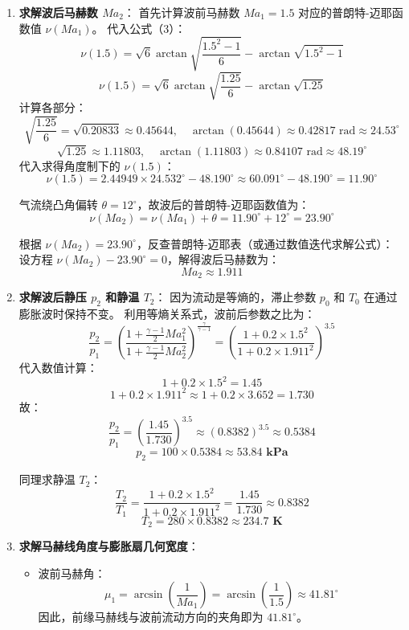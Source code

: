 \documentclass[11pt,a4paper]{ctexart}
\begin{document}
\begin{enumerate}
    \item \textbf{求解波后马赫数 $Ma_2$}：
    首先计算波前马赫数 $Ma_1 = 1.5$ 对应的普朗特-迈耶函数值 $\nu(Ma_1)$。
    代入公式（3）：
    \[
    \nu(1.5) = \sqrt{6} \arctan \sqrt{\frac{1.5^2 - 1}{6}} - \arctan \sqrt{1.5^2 - 1}
    \]
    \[
    \nu(1.5) = \sqrt{6} \arctan \sqrt{\frac{1.25}{6}} - \arctan \sqrt{1.25}
    \]
    计算各部分：
    \[
    \sqrt{\frac{1.25}{6}} = \sqrt{0.20833} \approx 0.45644, \quad \arctan(0.45644) \approx 0.42817\text{ rad} \approx 24.53^\circ
    \]
    \[
    \sqrt{1.25} \approx 1.11803, \quad \arctan(1.11803) \approx 0.84107\text{ rad} \approx 48.19^\circ
    \]
    代入求得角度制下的 $\nu(1.5)$：
    \[
    \nu(1.5) = 2.44949 \times 24.532^\circ - 48.190^\circ \approx 60.091^\circ - 48.190^\circ = 11.90^\circ
    \]
    
    气流绕凸角偏转 $\theta = 12^\circ$，故波后的普朗特-迈耶函数值为：
    \[
    \nu(Ma_2) = \nu(Ma_1) + \theta = 11.90^\circ + 12^\circ = 23.90^\circ
    \]
    
    根据 $\nu(Ma_2) = 23.90^\circ$，反查普朗特-迈耶表（或通过数值迭代求解公式）：
    设方程 $\nu(Ma_2) - 23.90^\circ = 0$，解得波后马赫数为：
    \[
    Ma_2 \approx 1.911
    \]

    \item \textbf{求解波后静压 $p_2$ 和静温 $T_2$}：
    因为流动是等熵的，滞止参数 $p_0$ 和 $T_0$ 在通过膨胀波时保持不变。
    利用等熵关系式，波前后参数之比为：
    \[
    \frac{p_2}{p_1} = \left(\frac{1 + \frac{\gamma-1}{2}Ma_1^2}{1 + \frac{\gamma-1}{2}Ma_2^2}\right)^{\frac{\gamma}{\gamma-1}} = \left(\frac{1 + 0.2 \times 1.5^2}{1 + 0.2 \times 1.911^2}\right)^{3.5}
    \]
    代入数值计算：
    \[
    1 + 0.2 \times 1.5^2 = 1.45
    \]
    \[
    1 + 0.2 \times 1.911^2 \approx 1 + 0.2 \times 3.652 = 1.730
    \]
    故：
    \[
    \frac{p_2}{p_1} = \left(\frac{1.45}{1.730}\right)^{3.5} \approx (0.8382)^{3.5} \approx 0.5384
    \]
    \[
    p_2 = 100 \times 0.5384 \approx \mathbf{53.84\text{ kPa}}
    \]
    
    同理求静温 $T_2$：
    \[
    \frac{T_2}{T_1} = \frac{1 + 0.2 \times 1.5^2}{1 + 0.2 \times 1.911^2} = \frac{1.45}{1.730} \approx 0.8382
    \]
    \[
    T_2 = 280 \times 0.8382 \approx \mathbf{234.7\text{ K}}
    \]

    \item \textbf{求解马赫线角度与膨胀扇几何宽度}：
    \begin{itemize}
        \item 波前马赫角：
        \[
        \mu_1 = \arcsin\left(\frac{1}{Ma_1}\right) = \arcsin\left(\frac{1}{1.5}\right) \approx 41.81^\circ
        \]
        因此，前缘马赫线与波前流动方向的夹角即为 \textbf{$41.81^\circ$}。
        

\end{itemize}
\end{enumerate}
\end{document}
